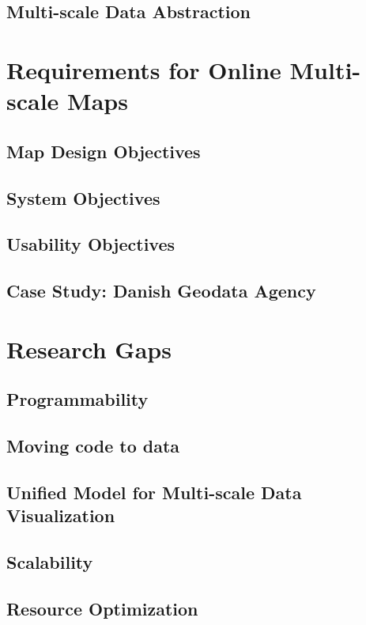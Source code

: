 \subsection{Multi-scale Data Abstraction}

\section{Requirements for Online Multi-scale Maps}
\subsection{Map Design Objectives}
\subsection{System Objectives}
\subsection{Usability Objectives}
\subsection{Case Study: Danish Geodata Agency}

\section{Research Gaps}
\subsection{Programmability}
\subsection{Moving code to data}
\subsection{Unified Model for Multi-scale Data Visualization}
\subsection{Scalability}
\subsection{Resource Optimization}

